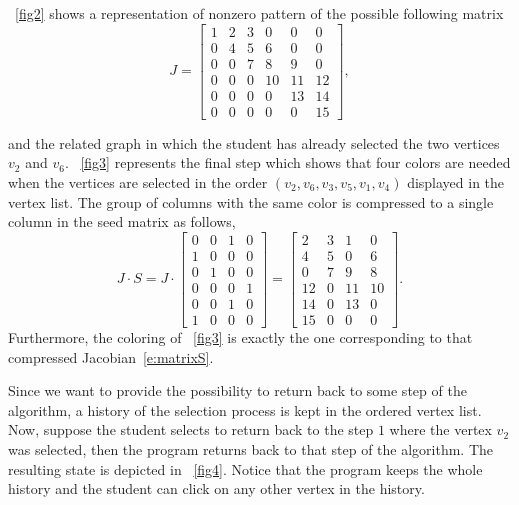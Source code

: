 \documentclass[12pt, oneside]{book}
\begin{document}
\figurename~\ref{fig2} shows a representation of nonzero pattern of the possible following matrix 
\begin{equation}
\label{e:matrixJ}
J =
 \begin{bmatrix}
 1  & 2 & 3 & 0 & 0 & 0 \\
 0  & 4 & 5 & 6 & 0 & 0 \\
 0  & 0 & 7 & 8 & 9 & 0\\
 0  & 0 & 0 & 10 & 11 & 12\\
 0  & 0 & 0 & 0 & 13  & 14  \\
 0  & 0 & 0 & 0 & 0 & 15
 \end{bmatrix},
\end{equation} 

and the related graph in which the student has already selected the two vertices $v_2$ and $v_6$. \figurename~\ref{fig3} represents the final step which shows that four colors are needed when the vertices are selected in the order $(v_2, v_6, v_3, v_5, v_1, v_4)$ displayed in the vertex list. The group of columns with the same color is compressed to a single column in the seed matrix as follows,
\begin{equation}
\label{e:matrixS}
J \cdot S =
J \cdot
 \begin{bmatrix}
 0  & 0 & 1 & 0 \\
 1  & 0 & 0 & 0 \\
 0  & 1 & 0 & 0 \\
 0  & 0 & 0 & 1 \\
 0  & 0 & 1 & 0 \\
 1  & 0 & 0 & 0
 \end{bmatrix}
=
 \begin{bmatrix}
 2  & 3 & 1  & 0 \\
 4  & 5 & 0  & 6 \\
 0  & 7 & 9  & 8 \\
 12 & 0 & 11 & 10\\
 14 & 0 & 13 & 0 \\
 15 & 0 & 0  & 0
 \end{bmatrix}.
\end{equation}
Furthermore, the coloring of \figurename~\ref{fig3} is exactly the one corresponding to that compressed Jacobian~\eqref{e:matrixS}.

Since we want to provide the possibility to return back to some step of the algorithm, a history of the selection process is kept in the ordered vertex list. Now, suppose the student selects to return back to the step $1$ where the vertex $v_2$ was selected, then the program returns back to that step of the algorithm. The resulting state is depicted in \figurename~\ref{fig4}. Notice that the program keeps the whole history and the student can click on any other vertex in the history.
\end{document}

